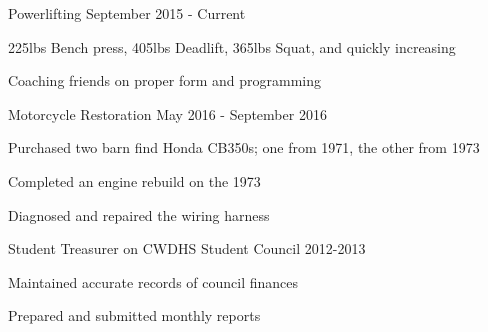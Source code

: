 

\begin{cventries}

  \cventry
    {Powerlifting} %
    {} %
    {} %
    {September 2015 - Current} %
    {
      \begin{cvitems} %
        \item {225lbs Bench press, 405lbs Deadlift, 365lbs Squat, and quickly increasing}
        \item {Coaching friends on proper form and programming}
      \end{cvitems}
    }

  \cventry
    {Motorcycle Restoration} %
    {} %
    {} %
    {May 2016 - September 2016} %
    {
      \begin{cvitems} %
        \item {Purchased two barn find Honda CB350s; one from 1971, the other from 1973}
        \item {Completed an engine rebuild on the 1973}
        \item {Diagnosed and repaired the wiring harness}
      \end{cvitems}
    }
  \cventry
    {Student Treasurer on CWDHS Student Council} %
    {} %
    {} %
    {2012-2013} %
    {
      \begin{cvitems} %
        \item {Maintained accurate records of council finances}
        \item {Prepared and submitted monthly reports}
      \end{cvitems}
    }
\end{cventries}
